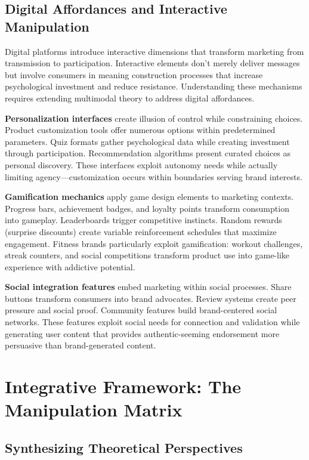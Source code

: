\subsection{Digital Affordances and Interactive Manipulation}

Digital platforms introduce interactive dimensions that transform marketing from transmission to participation. Interactive elements don't merely deliver messages but involve consumers in meaning construction processes that increase psychological investment and reduce resistance. Understanding these mechanisms requires extending multimodal theory to address digital affordances.

\textbf{Personalization interfaces} create illusion of control while constraining choices. Product customization tools offer numerous options within predetermined parameters. Quiz formats gather psychological data while creating investment through participation. Recommendation algorithms present curated choices as personal discovery. These interfaces exploit autonomy needs while actually limiting agency—customization occurs within boundaries serving brand interests.

\textbf{Gamification mechanics} apply game design elements to marketing contexts. Progress bars, achievement badges, and loyalty points transform consumption into gameplay. Leaderboards trigger competitive instincts. Random rewards (surprise discounts) create variable reinforcement schedules that maximize engagement. Fitness brands particularly exploit gamification: workout challenges, streak counters, and social competitions transform product use into game-like experience with addictive potential.

\textbf{Social integration features} embed marketing within social processes. Share buttons transform consumers into brand advocates. Review systems create peer pressure and social proof. Community features build brand-centered social networks. These features exploit social needs for connection and validation while generating user content that provides authentic-seeming endorsement more persuasive than brand-generated content.

\section{Integrative Framework: The Manipulation Matrix}
\label{sec:integration}

\subsection{Synthesizing Theoretical Perspectives}

